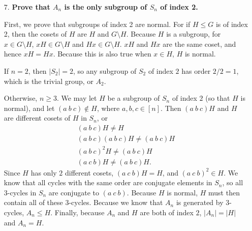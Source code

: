 \documentclass[a4paper,12pt]{article}
\begin{document}
\begin{enumerate}
    \item[7.]
        \boldmath
        \textbf{Prove that $A_n$ is the only subgroup of $S_n$ of index 2.} \par
        \unboldmath
        First, we prove that subgroups of index 2 are normal. For if $H \leq G$ is of index 2, then the cosets of $H$ are $H$ and $G \setminus H$. Because $H$ is a subgroup, for $x \in G \setminus H$, $xH \in G \setminus H$ and $Hx \in G \setminus H$. $xH$ and $Hx$ are the same coset, and hence $xH = Hx$. Because this is also true when $x \in H$, $H$ is normal. \par
        \iffalse
        Also, we know that the intersection of subgroups is a subgroup, and show that the same holds for normal subgroups. If $N_1$ and $N_2$ are normal, then the intersection $N = N_1 \cap N_2$ fulfills the property $gNg^{-1} \subseteq gN_1g^{-1}, gN_2g^{-1}$ for all $g \in G$, which means that $gNg^{-1}$ is contained in each of the normal subgroups and thus in $N$ as well. Because it is clear that $N \subseteq gNg^{-1}$, $N$ is normal. \par
        \fi
        \iffalse
        Next, we show that $A_n$ is the only nontrivial proper subgroup of $S_n$. \par
        Because $A_n$ is a subgroup of $S_n$ of index 2 by Lagrange's theorem and is the only proper subgroup (having an index that is not $1$ or $n$), it is also the only subgroup of index 2.
        \fi
        \iffalse
        Let $H \subset S_n$ be of index $2$. Since $S_n / H$ is isomorphic to $C_2 = \{ \pm 1 \}$, from the first isomorphism theorem, there is a surjective homomorphism $\varphi : S_n \to \{ \pm 1 \}$ with kernel $H$. Because all transpositions in $S_n$ are conjugate, for any transposition $(a\ b) \in S_n$, $\varphi((a\ b))$ is always the same element.
        \fi
        If $n = 2$, then $|S_2| = 2$, so any subgroup of $S_2$ of index $2$ has order $2/2 = 1$, which is the trivial group, or $A_2$. \par
        Otherwise, $n \geq 3$. We may let $H$ be a subgroup of $S_n$ of index $2$ (so that $H$ is normal), and let $(a\ b\ c) \notin H$, where $a, b, c \in [n]$. Then $(a\ b\ c)H$ and $H$ are different cosets of $H$ in $S_n$, or
        \begin{gather*}
            (a\ b\ c)H \neq H \\
            (a\ b\ c)(a\ b\ c)H \neq (a\ b\ c)H \\
            (a\ b\ c)^2 H \neq (a\ b\ c)H \\
            (a\ c\ b) H \neq (a\ b\ c)H.
        \end{gather*}
        Since $H$ has only $2$ different cosets, $(a\ c\ b) H = H$, and $(a\ c\ b)^2 \in H$. We know that all cycles with the same order are conjugate elements in $S_n$, so all $3$-cycles in $S_n$ are conjugate to $(a\ c\ b)$. Because $H$ is normal, $H$ must then contain all of these $3$-cycles. Because we know that $A_n$ is generated by $3$-cycles, $A_n \leq H$. Finally, because $A_n$ and $H$ are both of index $2$, $|A_n| = |H|$ and $A_n = H$.


\end{enumerate}
\end{document}
